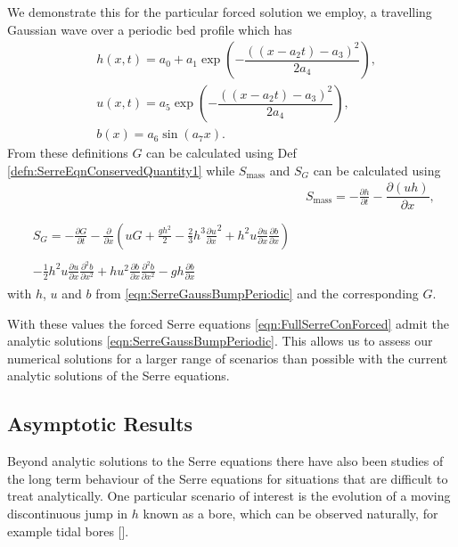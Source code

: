 We demonstrate this for the particular forced solution we employ, a travelling Gaussian wave over a periodic bed profile which has
\begin{subequations}
	\begin{align}
	&h(x,t) = a_0 + a_1\exp\left(-\dfrac{ \left(\left(x - a_2t\right) - a_3 \right)^2}{2a_4}\right), \\
	&u(x,t) = a_5\exp\left(-\dfrac{ \left(\left(x - a_2t\right) - a_3 \right)^2}{2a_4}\right), \\
	&b(x) = a_6\sin\left(a_7 x\right).
	\end{align}
	\label{eqn:SerreGaussBumpPeriodic}
\end{subequations}
From these definitions $G$ can be calculated using Def \ref{defn:SerreEqnConservedQuantity1} while $S_{\text{mass}}$ and $S_{G}$ can be calculated using 
\begin{align*}
&  S_{\text{mass}} = -\frac{\partial h}{\partial t} - \dfrac{\partial (uh)}{\partial x} ,  \\ \nonumber \\
\begin{split}
S_{G} = -\frac{\partial G}{\partial t}  - \frac{\partial}{\partial x} \left( {u} G + \frac{gh^2}{2} - \frac{2}{3}h^3 \frac{\partial {u}}{\partial x}^2 + h^2 {u}\frac{\partial {u}}{\partial x}\frac{\partial b}{\partial x} \right) \\ \\ - \frac{1}{2}h^2 {u} \frac{\partial {u}}{\partial x} \frac{\partial^2 b}{\partial x^2}  + h {u}^2\frac{\partial b}{\partial x}\frac{\partial^2 b}{\partial x^2} - gh\frac{\partial b}{\partial x}
\end{split}
\end{align*}
with $h$, $u$ and $b$ from \eqref{eqn:SerreGaussBumpPeriodic} and the corresponding $G$.

With these values the forced Serre equations \eqref{eqn:FullSerreConForced} admit the analytic solutions \eqref{eqn:SerreGaussBumpPeriodic}. This allows us to assess our numerical solutions for a larger range of scenarios than possible with the current analytic solutions of the Serre equations.


\subsection{Asymptotic Results}
Beyond analytic solutions to the Serre equations there have also been studies of the long term behaviour of the Serre equations for situations that are difficult to treat analytically. One particular scenario of interest is the evolution of a moving discontinuous jump in $h$ known as a bore, which can be observed naturally, for example tidal bores [].

